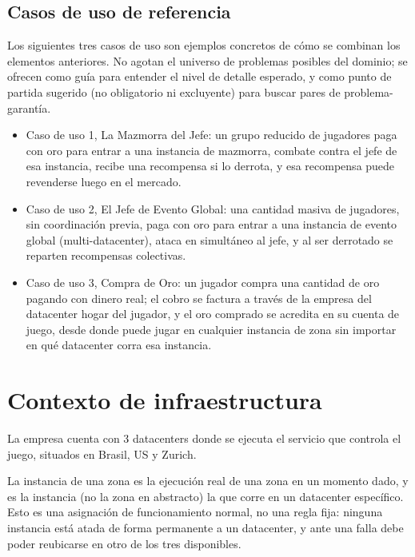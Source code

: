 \documentclass[variant=guia,cover=institutional,mode=screen]{ua-engineering-v6-article}
\begin{document}
    \subsection{Casos de uso de referencia}\label{subsec:casos-de-uso}

    Los siguientes tres casos de uso son ejemplos concretos de cómo se combinan los elementos anteriores.
    No agotan el universo de problemas posibles del dominio; se ofrecen como guía para entender el nivel de detalle esperado, y como punto de partida sugerido (no obligatorio ni excluyente) para buscar pares de problema-garantía.

    \begin{itemize}
        \item Caso de uso 1, La Mazmorra del Jefe: un grupo reducido de jugadores paga con oro para entrar a una instancia de mazmorra, combate contra el jefe de esa instancia, recibe una recompensa si lo derrota, y esa recompensa puede revenderse luego en el mercado.
        \item Caso de uso 2, El Jefe de Evento Global: una cantidad masiva de jugadores, sin coordinación previa, paga con oro para entrar a una instancia de evento global (multi-datacenter), ataca en simultáneo al jefe, y al ser derrotado se reparten recompensas colectivas.
        \item Caso de uso 3, Compra de Oro: un jugador compra una cantidad de oro pagando con dinero real; el cobro se factura a través de la empresa del datacenter hogar del jugador, y el oro comprado se acredita en su cuenta de juego, desde donde puede jugar en cualquier instancia de zona sin importar en qué datacenter corra esa instancia.
    \end{itemize}

    \section{Contexto de infraestructura}\label{sec:contexto-infraestructura}

    La empresa cuenta con 3 datacenters donde se ejecuta el servicio que controla el juego, situados en Brasil, US y Zurich.

    La instancia de una zona es la ejecución real de una zona en un momento dado, y es la instancia (no la zona en abstracto) la que corre en un datacenter específico.
    Esto es una asignación de funcionamiento normal, no una regla fija: ninguna instancia está atada de forma permanente a un datacenter, y ante una falla debe poder reubicarse en otro de los tres disponibles.
\end{document}
